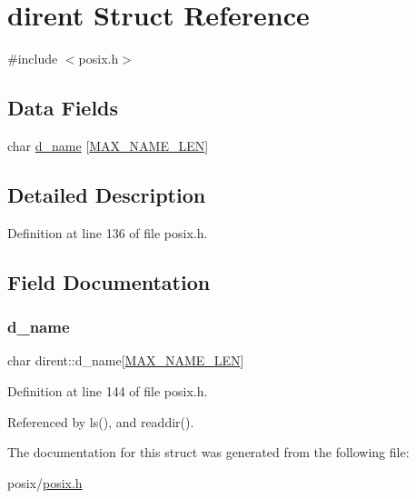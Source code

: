\hypertarget{structdirent}{}\section{dirent Struct Reference}
\label{structdirent}


{\ttfamily \#include $<$posix.\+h$>$}

\subsection*{Data Fields}
\begin{DoxyCompactItemize}
\item 
char \hyperlink{structdirent_ae61380f3ccbc6c32e8650d7bce76197b}{d\+\_\+name} \mbox{[}\hyperlink{posix_8h_afd709f201d7643c3909621f620ea648a}{M\+A\+X\+\_\+\+N\+A\+M\+E\+\_\+\+L\+EN}\mbox{]}
\end{DoxyCompactItemize}


\subsection{Detailed Description}


Definition at line 136 of file posix.\+h.



\subsection{Field Documentation}
\mbox{\label{structdirent_ae61380f3ccbc6c32e8650d7bce76197b}} 
\subsubsection{\texorpdfstring{d\+\_\+name}{d\_name}}
{\footnotesize\ttfamily char dirent\+::d\+\_\+name\mbox{[}\hyperlink{posix_8h_afd709f201d7643c3909621f620ea648a}{M\+A\+X\+\_\+\+N\+A\+M\+E\+\_\+\+L\+EN}\mbox{]}}



Definition at line 144 of file posix.\+h.



Referenced by ls(), and readdir().



The documentation for this struct was generated from the following file\+:\begin{DoxyCompactItemize}
\item 
posix/\hyperlink{posix_8h}{posix.\+h}\end{DoxyCompactItemize}
